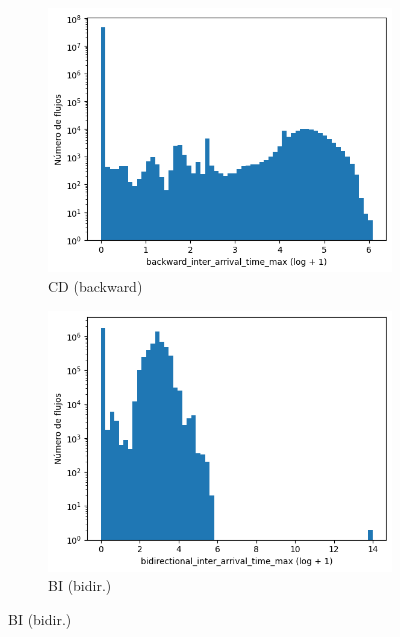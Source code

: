 \begin{figure}[H]
\begin{subfigure}[b]{0.26\textwidth}
        \includegraphics[width=\textwidth]{media/packet_pincer_cicddos/backward_inter_arrival_time_max_log_x_log_y.png}
        \caption{CD (backward)}
    \end{subfigure}
    \hfill
    \begin{subfigure}[b]{0.26\textwidth}
        \centering
        \includegraphics[width=\linewidth]{media/packet_pincer_botiot/bidirectional_inter_arrival_time_max_log_x_log_y.png}
        \caption{BI (bidir.)}

\end{subfigure}
\end{figure}
